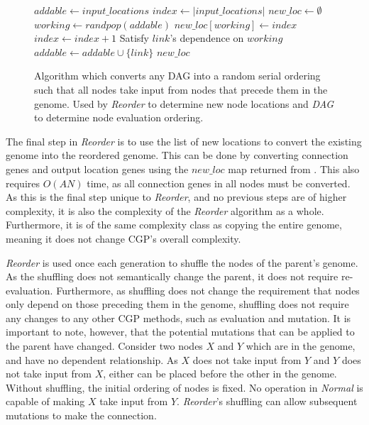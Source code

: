 \documentclass[journal]{IEEEtran}
\begin{document}
\begin{figure}
  \begin{algorithmic}
    \State $addable \leftarrow input\_locations$
    \State $index \leftarrow |input\_locations|$
    \State $new\_loc \leftarrow \emptyset$
      \State $working \leftarrow randpop(addable)$
        \State $new\_loc[working] \leftarrow index$
        \State $index \leftarrow index + 1$
      \EndIf
        \State Satisfy $link$'s dependence on $working$
          \State $addable \leftarrow addable \cup \{link\}$
        \EndIf
      \EndFor
    \EndWhile
    \State\Return $new\_loc$
    \EndProcedure
  \end{algorithmic}
  \caption{Algorithm which converts any DAG into a random serial ordering such
           that all nodes take input from nodes that precede them in the genome.
           Used by \emph{Reorder} to determine new node locations and \emph{DAG} to
           determine node evaluation ordering.}
  \label{fig:reorder}
\end{figure}

The final step in \emph{Reorder} is to use the list of new locations to convert
the existing genome into the reordered genome.  This can be done
by converting connection genes and output location genes using
the $new\_loc$ map returned from .
This also requires $O(AN)$ time, as all connection genes in all nodes must
be converted.  As this is the final step unique to \emph{Reorder}, and
no previous steps are of higher complexity, it is also the complexity of
the \emph{Reorder} algorithm as a whole.  Furthermore, it is of the same complexity class
as copying the entire genome, meaning it does not change CGP's overall complexity.

\emph{Reorder} is used once each generation to shuffle the nodes of the parent's
genome.  As the shuffling does not semantically change the parent, it does
not require re-evaluation.  Furthermore, as shuffling does not change the requirement
that nodes only depend on those preceding them in the genome, shuffling does not
require any changes to any other CGP methods, such as evaluation and mutation.
It is important to note, however, that the potential mutations that can be applied to the parent
have changed.  Consider two nodes $X$ and $Y$ which are in the genome, and
have no dependent relationship.  As $X$ does not take input from $Y$ and
$Y$ does not take input from $X$, either can be placed before the other
in the genome.  Without shuffling, the initial ordering of nodes is fixed.
No operation in \emph{Normal} is capable of making $X$
take input from $Y$.  \emph{Reorder}'s shuffling can allow
subsequent mutations to make the connection.
\end{document}
